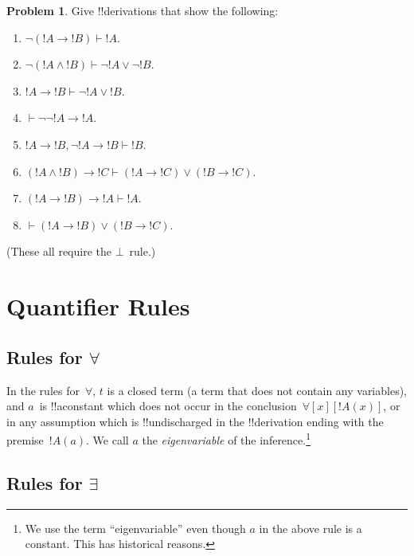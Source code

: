\documentclass[10pt,a4paper]{article}
\theoremstyle{plain}
\theoremstyle{definition}
\newtheorem{prob}{Problem}[section]
\theoremstyle{remark}
\newcommand*{\olfileid}[3]{}
\newcommand*{\olsection}[1]{\section*{#1}}
\providecommand{\AxiomC}[1]{}
\providecommand{\UnaryInfC}[1]{}
\providecommand{\RightLabel}[1]{}
\providecommand{\DisplayProof}{}
\providecommand{\lif}{\mathbin{\rightarrow}}
\providecommand{\lforall}{\mathord{\forall}}
\providecommand{\lexists}{\mathord{\exists}}
\providecommand{\Proves}{\mathrel{\vdash}}
\providecommand{\Elim}[1]{}
\providecommand{\Intro}[1]{}
\providecommand{\Atom}{\mathrm{Atom}}
\providecommand{\Intro}{\mathrm{I}}
\providecommand{\FalseCl}{\bot}
\providecommand{\FalseCl}{\bot}
\begin{document}
\begin{prob}
Give !!{derivation}s that show the following:
\begin{enumerate}
\item $\lnot(!A \lif !B) \Proves !A$.
\item $\lnot(!A \land !B) \Proves \lnot !A \lor \lnot !B$.
\item $!A \lif !B \Proves \lnot !A \lor !B$.
\item $\Proves \lnot \lnot !A \lif !A$.
\item $!A \lif !B, \lnot !A \lif !B \Proves !B$.
\item $(!A \land !B) \lif !C \Proves (!A \lif !C) \lor (!B \lif !C)$.
\item $(!A \lif !B) \lif !A \Proves !A$.
\item $\Proves (!A \lif !B) \lor (!B \lif !C)$.
\end{enumerate}
(These all require the $\FalseCl$~rule.)
\end{prob}





\olfileid{fol}{ntd}{qrl}

\olsection{Quantifier Rules}

\subsection{Rules for $\lforall$}

\begin{defish}
\AxiomC{$!A(a)$}
\RightLabel{\Intro{\lforall}}
\UnaryInfC{$\lforall[x][\Atom{!A}{x}]$}
\DisplayProof
\hfill
\AxiomC{$\lforall[x][\Atom{!A}{x}]$}
\RightLabel{\Elim{\lforall}}
\UnaryInfC{$!A(t)$}
\DisplayProof
\end{defish}

In the rules for~$\lforall$, $t$ is a closed term (a term that does
not contain any variables), and $a$~is !!a{constant} which does not
occur in the conclusion~$\lforall[x][!A(x)]$, or in any assumption
which is !!{undischarged} in the !!{derivation} ending with the
premise~$!A(a)$. We call $a$ the \emph{eigenvariable} of the
\Intro{\lforall} inference.\footnote{We use the term ``eigenvariable''
even though $a$ in the above rule is a constant. This has historical
reasons.}

\subsection{Rules for $\lexists$}
\end{document}
